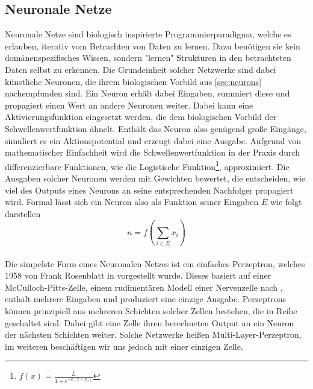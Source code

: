 \subsection{Neuronale Netze}
Neuronale Netze sind biologisch inspirierte Programmierparadigma, welche es erlauben, iterativ vom Betrachten von Daten zu lernen. Dazu benötigen sie kein domänenspezifisches Wissen, sondern "lernen" Strukturen in den betrachteten Daten selbst zu erkennen. Die Grundeinheit solcher Netzwerke sind dabei künstliche Neuronen, die ihrem biologischen Vorbild aus \ref{sec:neurons} nachempfunden sind. Ein Neuron erhält dabei Eingaben, summiert diese und propagiert einen Wert an andere Neuronen weiter. Dabei kann eine Aktivierungsfunktion eingesetzt werden, die dem biologischen Vorbild der Schwellenwertfunktion ähnelt. Enthält das Neuron also genügend große Eingänge, simuliert es ein Aktionspotential und erzeugt dabei eine Ausgabe. Aufgrund von mathematischer Einfachheit wird die Schwellenwertfunktion in der Praxis durch differenzierbare Funktionen, wie die Logistische Funktion\footnote{$f(x) = \frac{L}{1+e^{-k(x-x_0)}}$}, approximiert. Die Ausgaben solcher Neuronen werden mit Gewichten bewertet, die entscheiden, wie viel des Outputs eines Neurons an seine entsprechenden Nachfolger propagiert wird. Formal lässt sich ein Neuron also als Funktion seiner Eingaben $E$ wie folgt darstellen $$n = f\left(\sum_{i\in E} x_i\right)$$\\
Die simpelste Form eines Neuronalen Netzes ist ein einfaches Perzeptron, welches 1958 von Frank Rosenblatt in \cite{rosenblatt1958perceptron} vorgestellt wurde. Dieses basiert auf einer McCulloch-Pitts-Zelle, einem rudimentären Modell einer Nervenzelle nach \cite{mcculloch1943logical}, enthält mehrere Eingaben und produziert eine einzige Ausgabe. Perzeptrons können prinzipiell aus mehreren Schichten solcher Zellen bestehen, die in Reihe geschaltet sind. Dabei gibt eine Zelle ihren berechneten Output an ein Neuron der nächsten Schichten weiter. Solche Netzwerke heißen Multi-Layer-Perzeptron, im weiteren beschäftigen wir uns jedoch mit einer einzigen Zelle.
